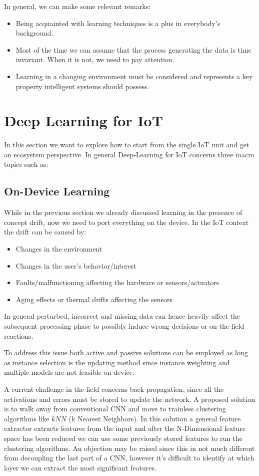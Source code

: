 \documentclass{article}
\begin{document}
      In general, we can make some relevant remarks:
      \begin{itemize}
        \item Being acquainted with learning techniques is a plus in everybody’s background.
        \item Most of the time we can assume that the process generating the data is time invariant. When it is not, we need to pay attention.
        \item Learning in a changing environment must be considered and represents a key property intelligent systems should possess.
      \end{itemize}

  \section{Deep Learning for IoT}
    In this section we want to explore how to start from the single IoT unit and get an ecosystem perspective. In general Deep-Learning for IoT concerns three macro topics such as:
    \subsection{On-Device Learning}
      While in the previous section we already discussed learning in the presence of concept drift, now we need to port everything on the device. In the IoT context the drift can be caused by:
      \begin{itemize}
        \item Changes in the environment
        \item Changes in the user's behavior/interest
        \item Faults/malfunctioning affecting the hardware or sensors/actuators
        \item Aging effects or thermal drifts affecting the sensors
      \end{itemize}
      In general perturbed, incorrect and missing data can hence heavily affect the subsequent processing phase to possibly induce wrong decisions or on-the-field reactions. 

      To address this issue both active and passive solutions can be employed as long as instance selection is the updating method since instance weighting and multiple models are not feasible on device.

      A current challenge in the field concerns back propagation, since all the activations and errors must be stored to update the network. A proposed solution is to walk away from conventional CNN and move to trainless clustering algorithms like $kNN$ (k Nearest Neighbors). In this solution a general feature extractor
      extracts features from the input and after the N-Dimensional feature space has been reduced we can use some previously stored features to run the clustering algorithms. An objection may be raised since this in not much different from decoupling the last part of a CNN, however it's difficult to identify at which layer
      we can extract the most significant features.
\end{document}
